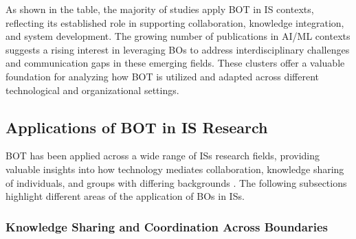 \documentclass[12pt,oneside]{article}
\begin{document}
As shown in the table, the majority of studies apply \ac{BOT} in \ac{IS} contexts, reflecting its established role in supporting collaboration, knowledge integration, and system development. The growing number of publications in \ac{AI}/\ac{ML} contexts suggests a rising interest in leveraging \ac{BO}s to address interdisciplinary challenges and communication gaps in these emerging fields. These clusters offer a valuable foundation for analyzing how \ac{BOT} is utilized and adapted across different technological and organizational settings.

\subsection{Applications of BOT in IS Research} \label{applications-of-bot-in-is-research}

\ac{BOT} has been applied across a wide range of \ac{IS}s research fields, providing valuable insights into how technology mediates collaboration, knowledge sharing of individuals, and groups with differing backgrounds \citep[1]{huvila2017boundary}. The following subsections highlight different areas of the application of \ac{BO}s in \ac{IS}s.

\subsubsection{Knowledge Sharing and Coordination Across Boundaries} \label{knowledge-sharing}
\end{document}
